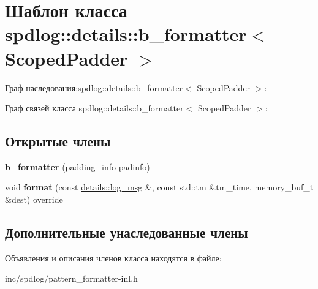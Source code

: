 \hypertarget{classspdlog_1_1details_1_1b__formatter}{}\section{Шаблон класса spdlog\+:\+:details\+:\+:b\+\_\+formatter$<$ Scoped\+Padder $>$}
\label{classspdlog_1_1details_1_1b__formatter}


Граф наследования\+:spdlog\+:\+:details\+:\+:b\+\_\+formatter$<$ Scoped\+Padder $>$\+:


Граф связей класса spdlog\+:\+:details\+:\+:b\+\_\+formatter$<$ Scoped\+Padder $>$\+:
\subsection*{Открытые члены}
\begin{DoxyCompactItemize}
\item 
\mbox{\label{classspdlog_1_1details_1_1b__formatter_a861dea16182de4ab36f42d5a12199824}} 
{\bfseries b\+\_\+formatter} (\hyperlink{structspdlog_1_1details_1_1padding__info}{padding\+\_\+info} padinfo)
\item 
\mbox{\label{classspdlog_1_1details_1_1b__formatter_a2d238ab8edb40bae9d2c7cb53c545fe8}} 
void {\bfseries format} (const \hyperlink{structspdlog_1_1details_1_1log__msg}{details\+::log\+\_\+msg} \&, const std\+::tm \&tm\+\_\+time, memory\+\_\+buf\+\_\+t \&dest) override
\end{DoxyCompactItemize}
\subsection*{Дополнительные унаследованные члены}


Объявления и описания членов класса находятся в файле\+:\begin{DoxyCompactItemize}
\item 
inc/spdlog/pattern\+\_\+formatter-\/inl.\+h\end{DoxyCompactItemize}
